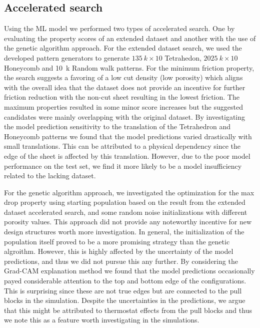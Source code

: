 \subsection{Accelerated search}
Using the \acrshort{ML} model we performed two types of accelerated search. One
by evaluating the property scores of an extended dataset and another with the
use of the genetic algorithm approach. For the extended dataset search, we used
the developed pattern generators to generate $\SI{135}{k} \times 10$
Tetrahedon, $\SI{2025}{k} \times 10$ Honeycomb and \SI{10}{k} Random walk
patterns. For the minimum friction property, the search suggests a favoring of a
low cut density (low porosity) which aligns with the overall idea that the
dataset does not provide an incentive for further friction reduction with the non-cut sheet resulting in the lowest friction. The
maximum properties resulted in some minor score increases but the suggested
candidates were mainly overlapping with the original dataset. By investigating the model prediction sensitivity to the translation of the Tetrahedron and Honeycomb patterns we found that the model predictions varied drastically with small translations. This can be attributed to a physical dependency since the edge of the sheet is affected by this
translation. However, due to the poor model performance on the test set, we find it more likely to be a model insufficiency related to the lacking dataset.

For the genetic algorithm approach, we investigated the optimization for the max
drop property using starting population based on the result from the
extended dataset accelerated search, and some random noise initializations with
different porosity values. This approach did not provide any noteworthy
incentive for new design structures worth more investigation. In general, the
initialization of the population itself proved to be a more promising strategy
than the genetic algroithm. However, this is highly affected by the uncertainty
of the model predictions, and thus we did not pursue this any further. By
considering the Grad-CAM explanation method we found that the model predictions
occasionally payed considerable attention to the top and bottom edge of the
configurations. This is surprising since these are not true edges but are
connected to the pull blocks in the simulation. Despite the uncertainties in the
predictions, we argue that this might be attributed to thermostat effects from
the pull blocks and thus we note this as a feature worth investigating in the simulations.


